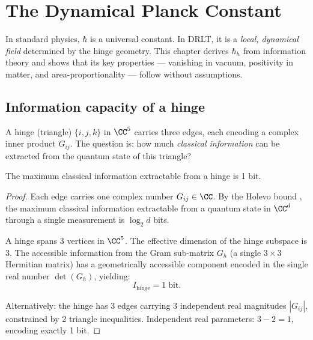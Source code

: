 \section{The Dynamical Planck Constant}
\label{ch:hbar}

In standard physics, $\hbar$ is a universal constant. In DRLT, it is a \emph{local, dynamical field} determined by the hinge geometry. This chapter derives $\hbar_h$ from information theory and shows that its key properties --- vanishing in vacuum, positivity in matter, and area-proportionality --- follow without assumptions.

\subsection{Information capacity of a hinge}

A hinge (triangle) $\{i, j, k\}$ in $\CC^5$ carries three edges, each encoding a complex inner product $G_{ij}$. The question is: how much \emph{classical information} can be extracted from the quantum state of this triangle?

\begin{theorem}
\label{thm:holevo}
The maximum classical information extractable from a hinge is 1 bit.
\end{theorem}

\begin{proof}
Each edge carries one complex number $G_{ij} \in \CC$. By the Holevo bound \cite{Holevo}, the maximum classical information extractable from a quantum state in $\CC^d$ through a single measurement is $\log_2 d$ bits.

A hinge spans 3 vertices in $\CC^5$. The effective dimension of the hinge subspace is 3. The accessible information from the Gram sub-matrix $G_h$ (a single $3\times 3$ Hermitian matrix) has a geometrically accessible component encoded in the single real number $\det(G_h)$, yielding:
\begin{equation}
I_\text{hinge} = 1\;\text{bit}.
\end{equation}

Alternatively: the hinge has 3 edges carrying 3 independent real magnitudes $|G_{ij}|$, constrained by 2 triangle inequalities. Independent real parameters: $3 - 2 = 1$, encoding exactly 1 bit.
\end{proof}

